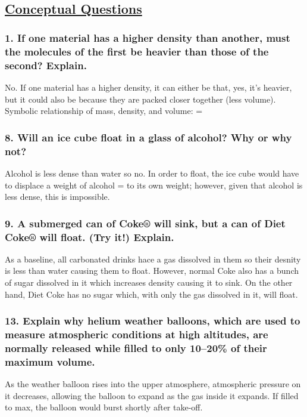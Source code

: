 \documentclass{article}
\title{
    \vspace{2in}
    \textmd{\textbf{\hmwkTitle}}\\
    \vspace{0.5in}
    \textmd{\textbf{\hmwkClass}}\\
    \vspace{4in}
}
\author{\hmwkAuthorName}
\date{}
\begin{document}
\maketitle
\newpage
\begin{center}
    \section*{\textbf{\underline {Conceptual Questions}}}
\end{center}
\subsubsection*{
    1. If one material has a higher density than another, must the molecules
    of the first be heavier than those of the second? Explain.
}
No. If one material has a higher density, it can either be that, yes, it's
heavier, but it could also be because they are packed closer together (less
volume). Symbolic relationship of mass, density, and volume: \rho =
\displaystyle{}
\subsubsection*{
    8. Will an ice cube float in a glass of alcohol? Why or why not? 
}
Alcohol is less dense than water so no. In order to float, the ice cube would
have to displace a weight of alcohol = to its own weight; however, given that
alcohol is less dense, this is impossible.
\subsubsection*{
    9. A submerged can of Coke® will sink, but a can of Diet
    Coke® will float. (Try it!) Explain.
}
As a baseline, all carbonated drinks hace a gas dissolved in them so their
desnity is less than water causing them to float. However, normal Coke also has
a bunch of sugar dissolved in it which increases density causing it to sink. On
the other hand, Diet Coke has no sugar which, with only the gas dissolved in it,
will float.
\subsubsection*{
    13. Explain why helium weather balloons, which are used to measure 
    atmospheric conditions at high altitudes, are normally released while 
    filled to only 10–20\% of their maximum volume.
}
As the weather balloon rises into the upper atmosphere, atmospheric pressure on
it decreases, allowing the balloon to expand as the gas inside it expands. If
filled to max, the balloon would burst shortly after take-off.
\end{document}
